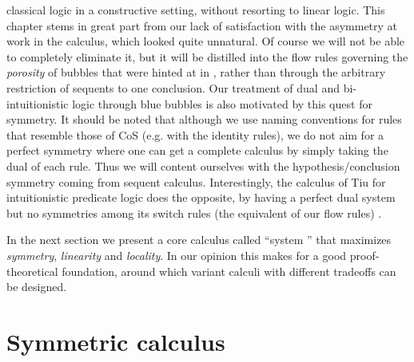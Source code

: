\begin{description}
    classical logic in a constructive setting, without resorting to linear
    logic. This chapter stems in great part from our lack of satisfaction with
    the asymmetry at work in the  calculus, which looked quite
    unnatural. Of course we will not be able to completely eliminate it, but it
    will be distilled into the flow rules governing the \emph{porosity} of
    bubbles that were hinted at in , rather than through the
    arbitrary restriction of sequents to one conclusion. Our treatment of dual and bi-intuitionistic logic through
    blue bubbles is also motivated by this quest for symmetry. It should be
    noted that although we use naming conventions for rules that resemble those
    of CoS (e.g. with the identity rules), we do not aim for a perfect symmetry
    where one can get a complete calculus by simply taking the dual of each
    rule.
    Thus we will content ourselves with the hypothesis/conclusion symmetry
    coming from sequent calculus. Interestingly, the calculus  of Tiu
    for intuitionistic predicate logic does the opposite, by having a perfect
    dual system  but no symmetries among its switch rules (the
    equivalent of our flow rules) \cite{tiu_local_2006}.
\end{description}

In the next section we present a core calculus called ``system '' that
maximizes \emph{symmetry}, \emph{linearity} and \emph{locality}. In our opinion
this makes for a good proof-theoretical foundation, around which variant calculi
with different tradeoffs can be designed.


\section{Symmetric calculus}

